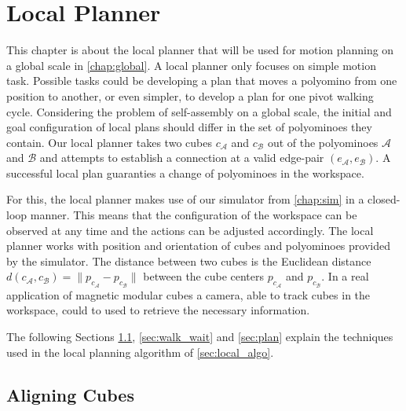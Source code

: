 \chapter{Local Planner}
\label{chap:local}

This chapter is about the local planner that will be used for motion planning on a global scale in \autoref{chap:global}.
A local planner only focuses on simple motion task.
Possible tasks could be developing a plan that moves a polyomino from one position to another, or even simpler, to develop a plan for one pivot walking cycle.
Considering the problem of self-assembly on a global scale, the initial and goal configuration of local plans should differ in the set of polyominoes they contain.
Our local planner takes two cubes $c_\mathcal{A}$ and $c_\mathcal{B}$ out of the polyominoes $\mathcal{A}$ and $\mathcal{B}$ and attempts to establish a connection at a valid edge-pair $(e_\mathcal{A}, e_\mathcal{B})$.
A successful local plan guaranties a change of polyominoes in the workspace.

For this, the local planner makes use of our simulator from \autoref{chap:sim} in a closed-loop manner.
This means that the configuration of the workspace can be observed at any time and the actions can be adjusted accordingly.
The local planner works with position and orientation of cubes and polyominoes provided by the simulator.
The distance between two cubes is the Euclidean distance $d(c_\mathcal{A}, c_\mathcal{B}) = \lVert p_{c_{\mathcal{A}}} - p_{c_{\mathcal{B}}}\rVert$ between the cube centers $p_{c_\mathcal{A}}$ and $p_{c_\mathcal{B}}$.
In a real application of magnetic modular cubes a camera, able to track cubes in the workspace, could to used to retrieve the necessary information. 

The following Sections \ref{sec:align}, \ref{sec:walk_wait} and \ref{sec:plan} explain the techniques used in the local planning algorithm of \autoref{sec:local_algo}.


\section{Aligning Cubes}
\label{sec:align}

